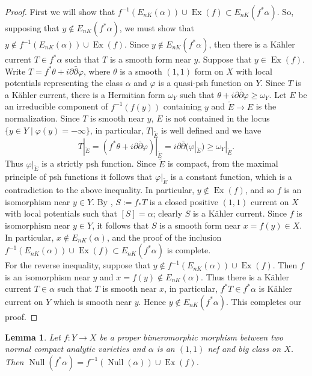 \documentclass[12pt]{amsart}
\theoremstyle{plain}
\newtheorem{lemma}[theorem]{Lemma}
\theoremstyle{remark}
\theoremstyle{definition}
\def\ddbar{\partial\bar\partial}
\def\Null{\operatorname{Null}}
\newcommand{\<}{\leq}
\def\>{\geq}
\newcommand{\vphi}{\varphi}
\def\>{\geq}
\def\Ex{\operatorname{Ex}}
\def\ddbar{\partial\bar{\partial}}
\theoremstyle{definition}
\theoremstyle{definition}
\numberwithin{equation}{section}
\theoremstyle{remark}
\begin{document}
\begin{proof}
First we will show that $f^{-1}(E_{nK}(\alpha))\cup\Ex(f)\subset E_{nK}(f^*\alpha)$. So,  supposing  that $y\notin E_{nK}(f^*\alpha)$, we must show that
$y\notin f^{-1}(E_{nK}(\alpha))\cup\Ex(f)$. Since $y\notin E_{nK}(f^*\alpha)$, then there is a K\"ahler current $T\in f^*\alpha$ such that $T$ is a smooth form near $y$. 
Suppose that  $y\in \Ex(f)$. Write $T=f^*\theta+i\ddbar\vphi$, where $\theta$ is a smooth $(1,1)$ form on $X$ with local potentials representing the class $\alpha$ and $\vphi$ is a quasi-psh function on $Y$. Since $T$ is a K\"ahler current, there is a Hermitian form $\omega_Y$ such that $\theta+i\ddbar\vphi\>\omega_Y$. Let $E$ be an irreducible component of $f^{-1}(f(y))$ containing $y$ and $\widetilde E\to E$ is the normalization. Since $T$ is smooth near $y$, $E$ is not contained in the locus $\{y\in Y\;|\; \vphi(y)=-\infty\}$, in particular, $T|_{\widetilde E}$ is well defined and we have 
\begin{equation}
    T|_{\widetilde E}=(f^*\theta+i\ddbar\vphi)|_{\widetilde E}=i\ddbar(\vphi|_{\widetilde E})\>\omega_Y|_{\widetilde E}.
\end{equation}
Thus $\vphi|_{\widetilde E}$ is a strictly psh function. Since $\widetilde E$ is compact, from the maximal principle of psh functions it follows that $\vphi|_{\widetilde E}$ is a constant function, which is a contradiction to the above inequality. In particular, $y\not\in\Ex(f)$, and so
$f$ is an isomorphism near $y\in Y$. By \cite[Lemma 3.4]{HP16}, $S:=f_*T$ is a closed positive $(1,1)$ current on $X$ with local potentials such that $[S]=\alpha$; clearly $S$ is a K\"ahler current. Since $f$ is isomorphism near $y\in Y$, it follows that $S$ is a smooth form near $x=f(y)\in X$. 
In particular, $x\not\in E_{nK}(\alpha)$, and the proof of the inclusion  $f^{-1}(E_{nK}(\alpha))\cup\Ex(f)\subset E_{nK}(f^*\alpha)$ is complete.\\ 

For the reverse inequality, suppose that $y\not\in f^{-1}(E_{nK}(\alpha))\cup\Ex(f)$. Then $f$ is an isomorphism near $y$ and $x=f(y)\not\in E_{nK}(\alpha)$. Thus there is a K\"ahler current $T\in \alpha$ such that $T$ is smooth near $x$, in particular, $f^*T\in f^*\alpha$ is K\"ahler current on $Y$ which is smooth near $y$. Hence $y\not\in E_{nK}(f^*\alpha)$. This completes our proof. 


\end{proof}


\begin{lemma}\label{lem:null-locus}
    Let $f:Y\to X$ be a proper bimeromorphic morphism between two normal compact analytic varieties and $\alpha$ is an $(1,1)$ nef and big class on $X$. Then $\Null(f^*\alpha)=f^{-1}(\Null(\alpha))\cup \Ex(f)$. 
\end{lemma}
\end{document}

